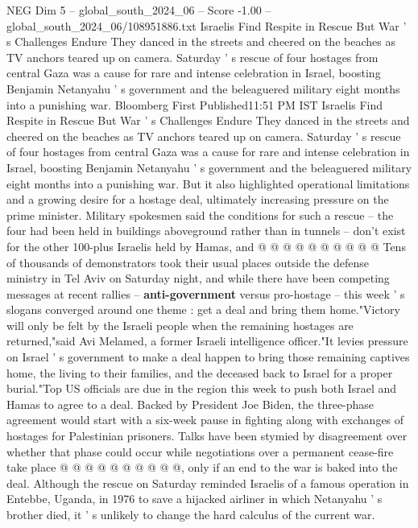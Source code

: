 \begin{textsample}{NEG Dim 5 – global\_south\_2024\_06 – Score -1.00 – global\_south\_2024\_06/108951886.txt}  \label{ex:f5_neg_222}
Israelis Find Respite in Rescue But War ' s Challenges Endure They danced in the streets and cheered on the beaches as TV anchors teared up on camera.
Saturday ' s rescue of four hostages from central Gaza was a cause for rare and intense celebration in Israel, boosting Benjamin Netanyahu ' s government and the beleaguered military eight months into a punishing war.
Bloomberg First Published11:51 PM IST Israelis Find Respite in Rescue But War ' s Challenges Endure They danced in the streets and cheered on the beaches as TV anchors teared up on camera.
Saturday ' s rescue of four hostages from central Gaza was a cause for rare and intense celebration in Israel, boosting Benjamin Netanyahu ' s government and the beleaguered military eight months into a punishing war.
But it also highlighted operational limitations and a growing desire for a hostage deal, ultimately increasing pressure on the prime minister.
Military spokesmen said the conditions for such a rescue -- the four had been held in buildings aboveground rather than in tunnels -- don't exist for the other 100-plus Israelis held by Hamas, and @ @ @ @ @ @ @ @ @ @ Tens of thousands of demonstrators took their usual places outside the defense ministry in Tel Aviv on Saturday night, and while there have been competing messages at recent rallies -- \textbf{anti-government} versus pro-hostage -- this week ' s slogans converged around one theme : get a deal and bring them home."Victory will only be felt by the Israeli people when the remaining hostages are returned,"said Avi Melamed, a former Israeli intelligence officer."It levies pressure on Israel ' s government to make a deal happen to bring those remaining captives home, the living to their families, and the deceased back to Israel for a proper burial."Top US officials are due in the region this week to push both Israel and Hamas to agree to a deal.
Backed by President Joe Biden, the three-phase agreement would start with a six-week pause in fighting along with exchanges of hostages for Palestinian prisoners.
Talks have been stymied by disagreement over whether that phase could occur while negotiations over a permanent cease-fire take place @ @ @ @ @ @ @ @ @ @, only if an end to the war is baked into the deal.
Although the rescue on Saturday reminded Israelis of a famous operation in Entebbe, Uganda, in 1976 to save a hijacked airliner in which Netanyahu ' s brother died, it ' s unlikely to change the hard calculus of the current war.

\end{textsample}
